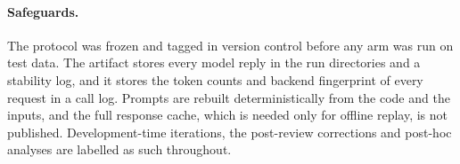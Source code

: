 \paragraph{Safeguards.}
The protocol was frozen and tagged in version control before any arm was run on test data. The artifact stores every model reply in the run directories and a stability log, and it stores the token counts and backend fingerprint of every request in a call log. Prompts are rebuilt deterministically from the code and the inputs, and the full response cache, which is needed only for offline replay, is not published. Development-time iterations, the post-review corrections and post-hoc analyses are labelled as such throughout.
